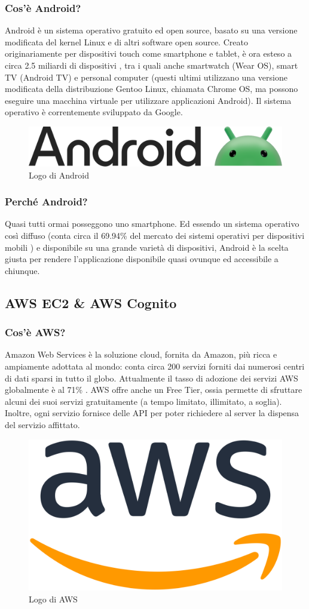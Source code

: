             \subsubsection{Cos'è Android? \cite{Wikipedia1}}
                Android è un sistema operativo gratuito ed open source, basato su una versione modificata del kernel Linux e di altri software open source. Creato originariamente per dispositivi touch come smartphone e tablet, è ora esteso a circa 2.5 miliardi di dispositivi \cite{Google1}, tra i quali anche smartwatch (Wear OS), smart TV (Android TV) e personal computer (questi ultimi utilizzano una versione modificata della distribuzione Gentoo Linux, chiamata Chrome OS, ma possono eseguire una macchina virtuale per utilizzare applicazioni Android). Il sistema operativo è correntemente sviluppato da Google.
            \begin{figure}[htbp!]
                \centering
                \includegraphics[width=0.5\linewidth]{Immagini/System Design/Android.png}
                \caption{Logo di Android}
            \end{figure}
            \subsubsection{Perché Android?}
                Quasi tutti ormai posseggono uno smartphone. Ed essendo un sistema operativo così diffuso (conta circa il 69.94\% del mercato dei sistemi operativi per dispositivi mobili \cite{Statcounter1}) e disponibile su una grande varietà di dispositivi, Android è la scelta giusta per rendere l'applicazione disponibile quasi ovunque ed accessibile a chiunque.

         \subsection{AWS EC2 \& AWS Cognito}
            \subsubsection{Cos'è AWS? \cite{AWS1}}
                Amazon Web Services è la soluzione cloud, fornita da Amazon, più ricca e ampiamente adottata al mondo: conta circa 200 servizi forniti dai numerosi centri di dati sparsi in tutto il globo. Attualmente il tasso di adozione dei servizi AWS globalmente è al 71\% \cite{CNN1}. AWS offre anche un Free Tier, ossia permette di sfruttare alcuni dei suoi servizi gratuitamente (a tempo limitato, illimitato, a soglia). Inoltre, ogni servizio fornisce delle API per poter richiedere al server la dispensa del servizio affittato.
            \begin{figure}[htbp!]
                \centering
                \includegraphics[width=0.2\linewidth]{Immagini/System Design/AWS.png}
                \caption{Logo di AWS}
            \end{figure}
